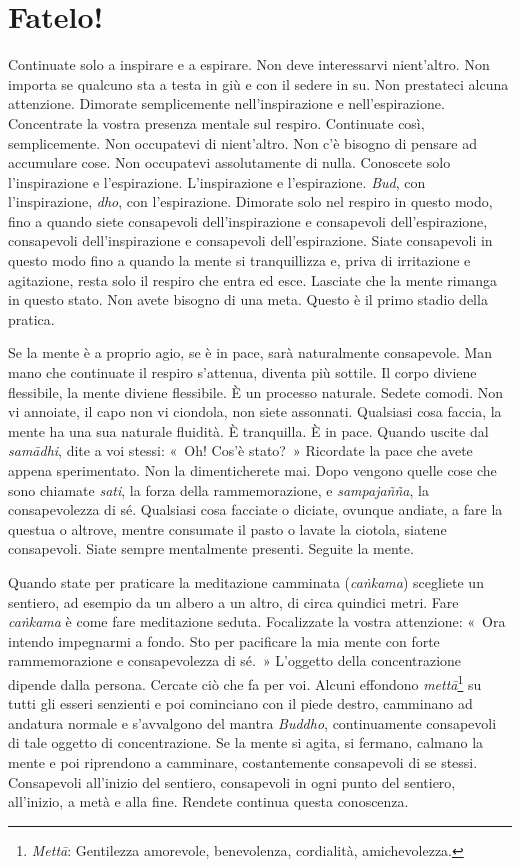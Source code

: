 \chapter{Fatelo!}

Continuate solo a inspirare e a espirare. Non deve interessarvi
nient'altro. Non importa se qualcuno sta a testa in giù e con il sedere
in su. Non prestateci alcuna attenzione. Dimorate semplicemente
nell'inspirazione e nell'espirazione. Concentrate la vostra presenza
mentale sul respiro. Continuate così, semplicemente. Non occupatevi di
nient'altro. Non c'è bisogno di pensare ad accumulare cose. Non
occupatevi assolutamente di nulla. Conoscete solo l'inspirazione e
l'espirazione. L'inspirazione e l'espirazione. \emph{Bud}, con
l'inspirazione, \emph{dho}, con l'espirazione. Dimorate solo nel respiro
in questo modo, fino a quando siete consapevoli dell'inspirazione e
consapevoli dell'espirazione, consapevoli dell'inspirazione e
consapevoli dell'espirazione. Siate consapevoli in questo modo fino a
quando la mente si tranquillizza e, priva di irritazione e agitazione,
resta solo il respiro che entra ed esce. Lasciate che la mente rimanga
in questo stato. Non avete bisogno di una meta. Questo è il primo stadio
della pratica.

Se la mente è a proprio agio, se è in pace, sarà naturalmente
consapevole. Man mano che continuate il respiro s'attenua, diventa più
sottile. Il corpo diviene flessibile, la mente diviene flessibile. È un
processo naturale. Sedete comodi. Non vi annoiate, il capo non vi
ciondola, non siete assonnati. Qualsiasi cosa faccia, la mente ha una
sua naturale fluidità. È tranquilla. È in pace. Quando uscite dal
\emph{samādhi}, dite a voi stessi: «~Oh! Cos'è stato?~» Ricordate la
pace che avete appena sperimentato. Non la dimenticherete mai. Dopo
vengono quelle cose che sono chiamate \emph{sati}, la forza della
rammemorazione, e \emph{sampajañña}, la consapevolezza di sé. Qualsiasi
cosa facciate o diciate, ovunque andiate, a fare la questua o altrove,
mentre consumate il pasto o lavate la ciotola, siatene consapevoli.
Siate sempre mentalmente presenti. Seguite la mente.

Quando state per praticare la meditazione camminata (\emph{caṅkama})
scegliete un sentiero, ad esempio da un albero a un altro, di circa
quindici metri. Fare \emph{caṅkama} è come fare meditazione seduta.
Focalizzate la vostra attenzione: «~Ora intendo impegnarmi a fondo. Sto
per pacificare la mia mente con forte rammemorazione e consapevolezza di
sé.~» L'oggetto della concentrazione dipende dalla persona. Cercate ciò
che fa per voi. Alcuni effondono \emph{mettā}\footnote{\emph{Mettā}:
  Gentilezza amorevole, benevolenza, cordialità, amichevolezza.} su
tutti gli esseri senzienti e poi cominciano con il piede destro,
camminano ad andatura normale e s'avvalgono del mantra \emph{Buddho},
continuamente consapevoli di tale oggetto di concentrazione. Se la mente
si agita, si fermano, calmano la mente e poi riprendono a camminare,
costantemente consapevoli di se stessi. Consapevoli all'inizio del
sentiero, consapevoli in ogni punto del sentiero, all'inizio, a metà e
alla fine. Rendete continua questa conoscenza.

